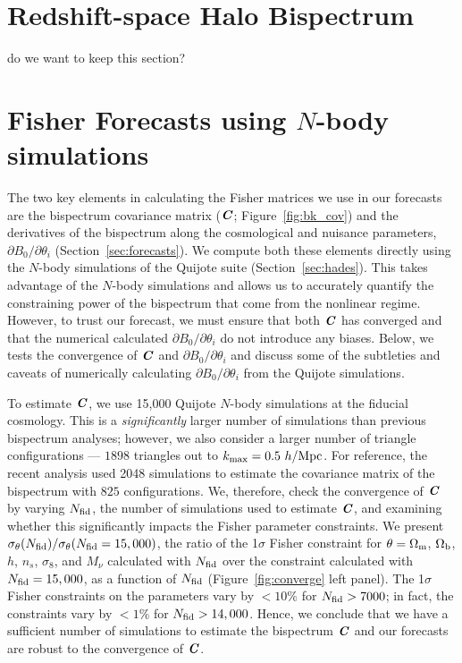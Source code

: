 \documentclass[12pt, letterpaper, preprint]{aastex62}
\newcommand{\Om}{\Omega_{\rm m}}
\newcommand{\Ob}{\Omega_{\rm b}}
\newcommand{\smnu}{M_\nu}
\newcommand{\sig}{\sigma_8}
\newcommand{\bfi}[1]{\textbf{\textit{#1}}}
\newcommand{\ch}[1]{{\color{orange}{\bf CH:} #1}}
\begin{document}
\section{Redshift-space Halo Bispectrum} 
\ch{do we want to keep this section?} 

\section{Fisher Forecasts using $N$-body simulations} \label{sec:numerical}
The two key elements in calculating the Fisher matrices we use in our forecasts
are the bispectrum covariance matrix ($\bfi{C}$; Figure~\ref{fig:bk_cov}) and 
the derivatives of the bispectrum along the cosmological and nuisance parameters, 
$\partial B_0/\partial \theta_i$ (Section~\ref{sec:forecasts}). We compute 
both these elements directly using the $N$-body simulations of the Quijote suite 
(Section~\ref{sec:hades}). This takes advantage of the $N$-body simulations and 
allows us to accurately quantify the constraining power of the bispectrum that 
come from the nonlinear regime. However, to trust our forecast, we must ensure that 
both $\bfi{C}$ has converged and that the numerical calculated 
$\partial B_0/\partial \theta_i$ do not introduce any biases. Below, we tests 
the convergence of $\bfi{C}$ and $\partial B_0/\partial \theta_i$ and discuss
some of the subtleties and caveats of numerically calculating $\partial B_0/\partial \theta_i$ 
from the Quijote simulations. 

To estimate $\bfi{C}$, we use 15,000 Quijote $N$-body simulations at the 
fiducial cosmology. This is a \emph{significantly} larger number of simulations 
than previous bispectrum analyses; however, we also consider a larger number
of triangle configurations --- $1898$ triangles out to $k_{\rm max} = 0.5~h/{\rm Mpc}$. 
For reference, the recent \cite{gil-marin2017} analysis used 2048 simulations 
to estimate the covariance matrix of the bispectrum with $825$ configurations. 
We, therefore, check the convergence of $\bfi{C}$ by varying $N_{\rm fid}$, 
the number of simulations used to estimate $\bfi{C}$, and examining whether 
this significantly impacts the Fisher parameter constraints. We present 
$\sigma_\theta(N_{\rm fid})/\sigma_\theta(N_{\rm fid} = 15,000)$, the ratio of 
the 1$\sigma$ Fisher constraint for $\theta = \Om$, $\Ob$, $h$, $n_s$, $\sig$, 
and $\smnu$ calculated with $N_{\rm fid}$ over the constraint calculated with 
$N_{\rm fid} = 15,000$, as a function of $N_{\rm fid}$ (Figure~\ref{fig:converge} 
left panel). The 1$\sigma$ Fisher constraints on the parameters 
vary by $<10\%$ for $N_{\rm fid} > 7000$; in fact, the constraints vary by 
$<1\%$ for $N_{\rm fid} > 14,000$. Hence, we conclude that we have a sufficient 
number of simulations to estimate the bispectrum $\bfi{C}$ and our forecasts 
are robust to the convergence of $\bfi{C}$. 
\end{document}
